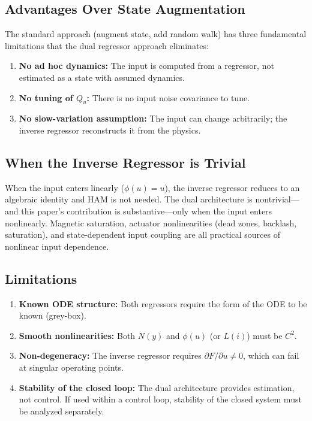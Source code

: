 \documentclass[lettersize,journal]{IEEEtran}
\begin{document}
\subsection{Advantages Over State Augmentation}

The standard approach (augment state, add random walk) has three fundamental limitations that the dual regressor approach eliminates:
\begin{enumerate}
    \item \textbf{No ad hoc dynamics:} The input is computed from a regressor, not estimated as a state with assumed dynamics.
    \item \textbf{No tuning of $Q_u$:} There is no input noise covariance to tune.
    \item \textbf{No slow-variation assumption:} The input can change arbitrarily; the inverse regressor reconstructs it from the physics.
\end{enumerate}

\subsection{When the Inverse Regressor is Trivial}

When the input enters linearly ($\phi(u) = u$), the inverse regressor reduces to an algebraic identity and HAM is not needed. The dual architecture is nontrivial---and this paper's contribution is substantive---only when the input enters nonlinearly. Magnetic saturation, actuator nonlinearities (dead zones, backlash, saturation), and state-dependent input coupling are all practical sources of nonlinear input dependence.

\subsection{Limitations}

\begin{enumerate}
    \item[(a)] \textbf{Known ODE structure:} Both regressors require the form of the ODE to be known (grey-box).
    \item[(b)] \textbf{Smooth nonlinearities:} Both $N(y)$ and $\phi(u)$ (or $L(i)$) must be $C^2$.
    \item[(c)] \textbf{Non-degeneracy:} The inverse regressor requires $\partial F / \partial u \neq 0$, which can fail at singular operating points.
    \item[(d)] \textbf{Stability of the closed loop:} The dual architecture provides estimation, not control. If used within a control loop, stability of the closed system must be analyzed separately.
\end{enumerate}
\end{document}
